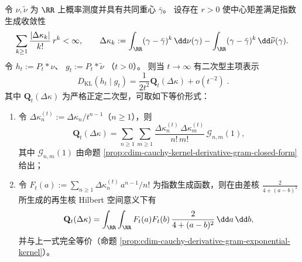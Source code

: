 \begin{proposition}\label{prop:cdim-poisson-kl-all-moment-quadratic-form}
令 \(\nu,\widetilde\nu\) 为 \(\RR\) 上概率测度并具有共同重心 \(\bar\gamma\)。
设存在 \(r>0\) 使中心矩差满足指数生成收敛性
\[
\sum_{k\ge 1}\frac{|\Delta\kappa_k|}{k!}\,r^k<\infty,
\qquad
\Delta\kappa_k
:=\int_{\RR}(\gamma-\bar\gamma)^k\,\dd\nu(\gamma)
-\int_{\RR}(\gamma-\bar\gamma)^k\,\dd\widetilde\nu(\gamma).
\]
令
\(
h_t:=P_t*\nu
\)、
\(
g_t:=P_t*\widetilde\nu
\)
（\(t>0\)）。
则当 \(t\to\infty\) 有二次型主项表示
\begin{equation}\label{eq:cdim-poisson-kl-all-moment-quadratic-form}
\boxed{\;
D_{\mathrm{KL}}(h_t\mid g_t)
=\frac{1}{2t^{2}}\mathbf Q_t(\Delta\kappa)+o(t^{-2})\; }.
\end{equation}
其中 \(\mathbf Q_t(\Delta\kappa)\) 为严格正定二次型，可取如下等价形式：
\begin{enumerate}
  \item 令 \(\Delta\kappa^{(t)}_n:=\Delta\kappa_n/t^{n-1}\)（\(n\ge 1\)），则
  \[
  \mathbf Q_t(\Delta\kappa)
  =\sum_{n\ge 1}\sum_{m\ge 1}\frac{\Delta\kappa^{(t)}_n\,\Delta\kappa^{(t)}_m}{n!\,m!}\,\mathcal G_{n,m}(1),
  \]
  其中 \(\mathcal G_{n,m}(1)\) 由命题 \ref{prop:cdim-cauchy-kernel-derivative-gram-closed-form} 给出；
  \item 令
  \(
  F_t(a):=\sum_{n\ge 1}\Delta\kappa^{(t)}_n\,a^{n-1}/n!
  \)
  为指数生成函数，则在由差核 \(\frac{2}{4+(a-b)^2}\) 所生成的再生核 Hilbert 空间意义下有
  \[
  \mathbf Q_t(\Delta\kappa)
  =\int_{\RR}\int_{\RR}F_t(a)F_t(b)\,\frac{2}{4+(a-b)^2}\,\dd a\,\dd b,
  \]
  并与上一式完全等价（命题 \ref{prop:cdim-cauchy-derivative-gram-exponential-kernel}）。
\end{enumerate}
\end{proposition}
